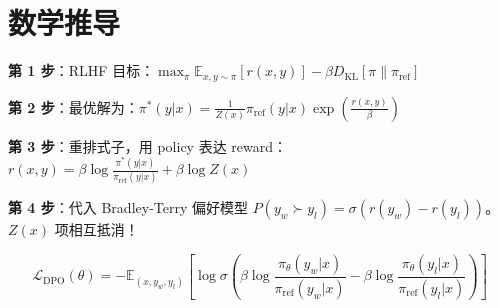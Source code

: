 \section{数学推导}
\label{mathematical-derivation}

\textbf{第 1 步}：RLHF 目标：$\max_\pi \mathbb{E}_{x,y\sim\pi}[r(x,y)] - \beta D_\text{KL}[\pi\|\pi_\text{ref}]$

\textbf{第 2 步}：最优解为：$\pi^*(y|x) = \frac{1}{Z(x)} \pi_\text{ref}(y|x) \exp\left(\frac{r(x,y)}{\beta}\right)$

\textbf{第 3 步}：重排式子，用 policy 表达 reward：$r(x,y) = \beta \log \frac{\pi^*(y|x)}{\pi_\text{ref}(y|x)} + \beta \log Z(x)$

\textbf{第 4 步}：代入 Bradley-Terry 偏好模型 $P(y_w \succ y_l) = \sigma(r(y_w) - r(y_l))$。$Z(x)$ 项相互抵消！

\begin{equation}
\boxed{\mathcal{L}_\text{DPO}(\theta) = -\mathbb{E}_{(x, y_w, y_l)}\left[\log\sigma\left(\beta\log\frac{\pi_\theta(y_w|x)}{\pi_\text{ref}(y_w|x)} - \beta\log\frac{\pi_\theta(y_l|x)}{\pi_\text{ref}(y_l|x)}\right)\right]}
\end{equation}

